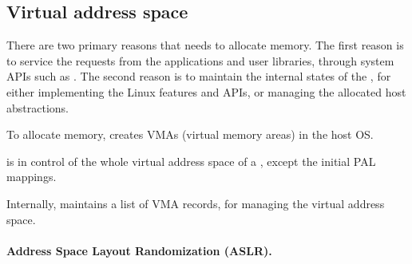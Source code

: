 \subsection{Virtual address space}
\label{sec:libos:vma}





There are two primary reasons
that \thelibos{} needs to allocate memory.
The first reason is to service the requests from the applications and user libraries,
through system APIs such as .
The second reason
is to maintain the internal states
of the \libos{},
for either implementing the Linux features and APIs, or managing the allocated host abstractions.



To allocate memory, \thelibos{} creates VMAs (virtual memory areas)
in the host OS.



\thelibos{} is in control of the whole virtual address space of a \picoproc{},
except the initial PAL mappings.








Internally, \thelibos{} maintains a list of VMA records, for managing the virtual address space.









\paragraph{Address Space Layout Randomization (ASLR).}


